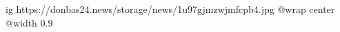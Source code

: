  
 
 
 
 

\ifcmt
  ig https://donbas24.news/storage/news/1u97gjmzwjmfcpb4.jpg
  @wrap center
  @width 0.9
\fi
